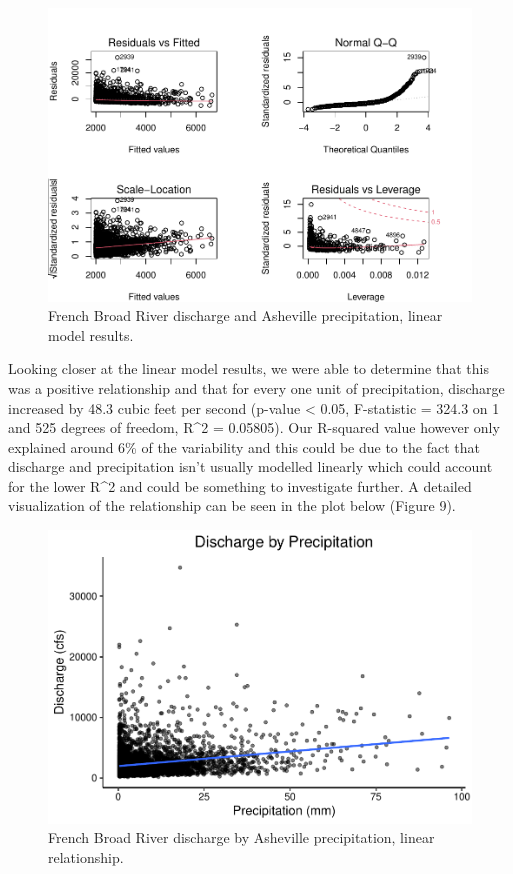 \documentclass[
]{article}
\begin{document}
\begin{figure}

{\centering \includegraphics{SD_AD_NVT_EDAfinal_files/figure-latex/unnamed-chunk-15-1} 

}

\caption{French Broad River discharge and Asheville precipitation, linear model results.}\label{fig:unnamed-chunk-15}
\end{figure}

Looking closer at the linear model results, we were able to determine
that this was a positive relationship and that for every one unit of
precipitation, discharge increased by 48.3 cubic feet per second
(p-value \textless{} 0.05, F-statistic = 324.3 on 1 and 525 degrees of
freedom, R\^{}2 = 0.05805). Our R-squared value however only explained
around 6\% of the variability and this could be due to the fact that
discharge and precipitation isn't usually modelled linearly which could
account for the lower R\^{}2 and could be something to investigate
further. A detailed visualization of the relationship can be seen in the
plot below (Figure 9).

\begin{figure}
\centering
\includegraphics{SD_AD_NVT_EDAfinal_files/figure-latex/unnamed-chunk-16-1.pdf}
\caption{French Broad River discharge by Asheville precipitation, linear
relationship.}
\end{figure}
\end{document}

